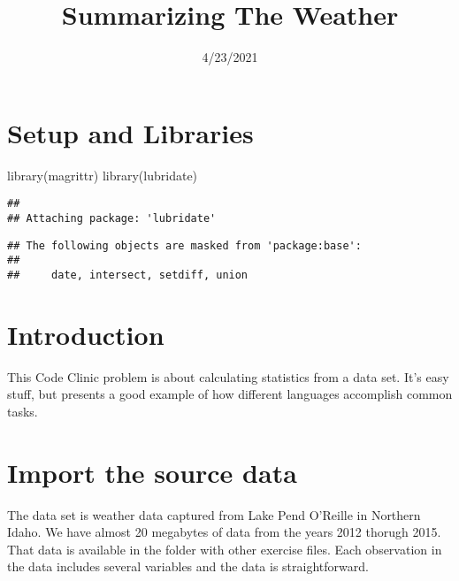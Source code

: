 \documentclass[
  11pt,
]{article}
\title{Summarizing The Weather}
\author{}
\date{\vspace{-2.5em}4/23/2021}
\newenvironment{Shaded}{\begin{snugshade}}{\end{snugshade}}
\newcommand{\FunctionTok}[1]{\textcolor[rgb]{0.00,0.00,0.00}{#1}}
\newcommand{\NormalTok}[1]{#1}
\begin{document}
\maketitle

{
\setcounter{tocdepth}{2}
\tableofcontents
}
\hypertarget{setup-and-libraries}{%
\section{Setup and Libraries}\label{setup-and-libraries}}

\begin{Shaded}
\begin{Highlighting}[]
\FunctionTok{library}\NormalTok{(magrittr)}
\FunctionTok{library}\NormalTok{(lubridate)}
\end{Highlighting}
\end{Shaded}

\begin{verbatim}
## 
## Attaching package: 'lubridate'
\end{verbatim}

\begin{verbatim}
## The following objects are masked from 'package:base':
## 
##     date, intersect, setdiff, union
\end{verbatim}

\hypertarget{introduction}{%
\section{Introduction}\label{introduction}}

This Code Clinic problem is about calculating statistics from a data
set. It's easy stuff, but presents a good example of how different
languages accomplish common tasks.

\hypertarget{import-the-source-data}{%
\section{Import the source data}\label{import-the-source-data}}

The data set is weather data captured from Lake Pend O'Reille in
Northern Idaho. We have almost 20 megabytes of data from the years 2012
thorugh 2015. That data is available in the folder with other exercise
files. Each observation in the data includes several variables and the
data is straightforward.
\end{document}
